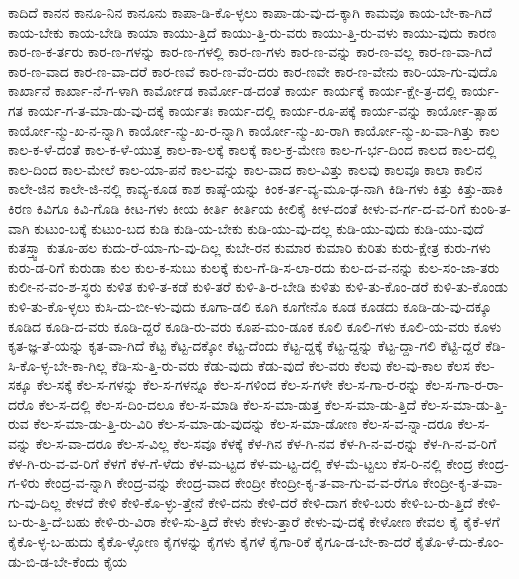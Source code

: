 {ಕಾದಿದೆ
ಕಾನನ
ಕಾನೂ-ನಿನ
ಕಾನೂನು
ಕಾಪಾ-ಡಿ-ಕೊ-ಳ್ಳಲು
ಕಾಪಾ-ಡು-ವು-ದ-ಕ್ಕಾಗಿ
ಕಾಮವೂ
ಕಾಯ-ಬೇ-ಕಾ-ಗಿದೆ
ಕಾಯ-ಬೇಕು
ಕಾಯ-ಬೇಡಿ
ಕಾಯಾ
ಕಾಯು-ತ್ತಿದೆ
ಕಾಯು-ತ್ತಿ-ರು-ವರು
ಕಾಯು-ತ್ತಿ-ರು-ವಳು
ಕಾಯು-ವುದು
ಕಾರಣ
ಕಾರ-ಣ-ಕ-ರ್ತರು
ಕಾರ-ಣ-ಗಳನ್ನು
ಕಾರ-ಣ-ಗಳಲ್ಲಿ
ಕಾರ-ಣ-ಗಳು
ಕಾರ-ಣ-ವನ್ನು
ಕಾರ-ಣ-ವಲ್ಲ
ಕಾರ-ಣ-ವಾ-ಗಿದೆ
ಕಾರ-ಣ-ವಾದ
ಕಾರ-ಣ-ವಾ-ದರೆ
ಕಾರ-ಣವೆ
ಕಾರ-ಣ-ವೆಂ-ದರು
ಕಾರ-ಣವೇ
ಕಾರ-ಣ-ವೇನು
ಕಾರಿ-ಯಾ-ಗು-ವುದೊ
ಕಾರ್ಖಾನೆ
ಕಾರ್ಖಾ-ನೆ-ಗ-ಳಾಗಿ
ಕಾರ್ಮೋಡ
ಕಾರ್ಮೋ-ಡ-ದಂತೆ
ಕಾರ್ಯ
ಕಾರ್ಯಕ್ಕೆ
ಕಾರ್ಯ-ಕ್ಷೇ-ತ್ರ-ದಲ್ಲಿ
ಕಾರ್ಯ-ಗತ
ಕಾರ್ಯ-ಗ-ತ-ಮಾ-ಡು-ವು-ದಕ್ಕೆ
ಕಾರ್ಯತಃ
ಕಾರ್ಯ-ದಲ್ಲಿ
ಕಾರ್ಯ-ರೂ-ಪಕ್ಕೆ
ಕಾರ್ಯ-ವನ್ನು
ಕಾರ್ಯೋ-ತ್ಸಾಹ
ಕಾರ್ಯೋ-ನ್ಮು-ಖ-ನ-ನ್ನಾಗಿ
ಕಾರ್ಯೋ-ನ್ಮು-ಖ-ರ-ನ್ನಾಗಿ
ಕಾರ್ಯೋ-ನ್ಮು-ಖ-ರಾಗಿ
ಕಾರ್ಯೋ-ನ್ಮು-ಖ-ವಾ-ಗಿತ್ತು
ಕಾಲ
ಕಾಲ-ಕ-ಳೆ-ದಂತೆ
ಕಾಲ-ಕ-ಳೆ-ಯುತ್ತ
ಕಾಲ-ಕಾ-ಲಕ್ಕೆ
ಕಾಲಕ್ಕೆ
ಕಾಲ-ಕ್ರ-ಮೇಣ
ಕಾಲ-ಗ-ರ್ಭ-ದಿಂದ
ಕಾಲದ
ಕಾಲ-ದಲ್ಲಿ
ಕಾಲ-ದಿಂದ
ಕಾಲ-ಮೇಲೆ
ಕಾಲ-ಯಾ-ಪನೆ
ಕಾಲ-ವನ್ನು
ಕಾಲ-ವಾದ
ಕಾಲ-ವಿತ್ತು
ಕಾಲವು
ಕಾಲವೂ
ಕಾಲಾ
ಕಾಲಿನ
ಕಾಲೇ-ಜಿನ
ಕಾಲೇ-ಜಿ-ನಲ್ಲಿ
ಕಾವ್ಯ-ಕೂಡ
ಕಾಶ
ಕಾಷ್ಠೆ-ಯನ್ನು
ಕಿಂಕ-ರ್ತ-ವ್ಯ-ಮೂ-ಢ-ನಾಗಿ
ಕಿಡಿ-ಗಳು
ಕಿತ್ತು
ಕಿತ್ತು-ಹಾಕಿ
ಕಿರಣ
ಕಿವಿಗೂ
ಕಿವಿ-ಗೊಡಿ
ಕೀಟ-ಗಳು
ಕೀಯ
ಕೀರ್ತಿ
ಕೀರ್ತಿಯ
ಕೀಲಿಕೈ
ಕೀಳ-ದಂತೆ
ಕೀಳು-ವ-ರ್ಗ-ದ-ವ-ರಿಗೆ
ಕುಂಠಿ-ತ-ವಾಗಿ
ಕುಟುಂ-ಬಕ್ಕೆ
ಕುಟುಂ-ಬದ
ಕುಡಿ
ಕುಡಿ-ಯ-ಬೇಕು
ಕುಡಿ-ಯು-ವು-ದಲ್ಲ
ಕುಡಿ-ಯು-ವುದು
ಕುಡಿ-ಯು-ವುದೆ
ಕುತಸ್ತ್ವಾ
ಕುತೂ-ಹಲ
ಕುದು-ರೆ-ಯಾ-ಗು-ವು-ದಿಲ್ಲ
ಕುಬೇ-ರನ
ಕುಮಾರ
ಕುಮಾರಿ
ಕುರಿತು
ಕುರು-ಕ್ಷೇತ್ರ
ಕುರು-ಗಳು
ಕುರು-ಡ-ರಿಗೆ
ಕುರುಡಾ
ಕುಲ
ಕುಲ-ಕ-ಸುಬು
ಕುಲಕ್ಕೆ
ಕುಲ-ಗೆ-ಡಿ-ಸ-ಲಾ-ರದು
ಕುಲ-ದ-ವ-ನನ್ನು
ಕುಲ-ಸಂ-ಜಾ-ತರು
ಕುಲೀ-ನ-ವಂ-ಶ-ಸ್ಥರು
ಕುಳಿತ
ಕುಳಿ-ತ-ಕಡೆ
ಕುಳಿ-ತರೆ
ಕುಳಿ-ತಿ-ರ-ಬೇಡಿ
ಕುಳಿತು
ಕುಳಿ-ತು-ಕೊಂ-ಡರೆ
ಕುಳಿ-ತು-ಕೊಂಡು
ಕುಳಿ-ತು-ಕೊ-ಳ್ಳಲು
ಕುಸಿ-ದು-ಬೀ-ಳು-ವುದು
ಕೂಗಾ-ಡಲಿ
ಕೂಗಿ
ಕೂಗೇನೊ
ಕೂಡ
ಕೂಡದು
ಕೂಡಿ-ಡು-ವು-ದಕ್ಕೂ
ಕೂಡಿದ
ಕೂಡಿ-ದ-ವರು
ಕೂಡಿ-ದ್ದರೆ
ಕೂಡಿ-ರು-ವರು
ಕೂಪ-ಮಂ-ಡೂಕ
ಕೂಲಿ
ಕೂಲಿ-ಗಳು
ಕೂಲಿ-ಯ-ವರು
ಕೂಳು
ಕೃತ-ಜ್ಞ-ತೆ-ಯನ್ನು
ಕೃತ-ವಾ-ಗಿದೆ
ಕೆಟ್ಟ
ಕೆಟ್ಟ-ದಕ್ಕೋ
ಕೆಟ್ಟ-ದೆಂದು
ಕೆಟ್ಟ-ದ್ದಕ್ಕೆ
ಕೆಟ್ಟ-ದ್ದನ್ನು
ಕೆಟ್ಟ-ದ್ದಾ-ಗಲಿ
ಕೆಟ್ಟಿ-ದ್ದರೆ
ಕೆಡಿ-ಸಿ-ಕೊ-ಳ್ಳ-ಬೇ-ಕಾ-ಗಿಲ್ಲ
ಕೆಡಿ-ಸು-ತ್ತಿ-ರು-ವರು
ಕೆಡು-ವುದು
ಕೆಡು-ವುದೆ
ಕೆಲ-ವರು
ಕೆಲವು
ಕೆಲ-ವು-ಕಾಲ
ಕೆಲಸ
ಕೆಲ-ಸಕ್ಕೂ
ಕೆಲ-ಸಕ್ಕೆ
ಕೆಲ-ಸ-ಗಳನ್ನು
ಕೆಲ-ಸ-ಗಳನ್ನೂ
ಕೆಲ-ಸ-ಗಳಿಂದ
ಕೆಲ-ಸ-ಗಳೇ
ಕೆಲ-ಸ-ಗಾ-ರ-ರನ್ನು
ಕೆಲ-ಸ-ಗಾ-ರ-ರಾ-ದರೊ
ಕೆಲ-ಸ-ದಲ್ಲಿ
ಕೆಲ-ಸ-ದಿಂ-ದಲೂ
ಕೆಲ-ಸ-ಮಾಡಿ
ಕೆಲ-ಸ-ಮಾ-ಡುತ್ತ
ಕೆಲ-ಸ-ಮಾ-ಡು-ತ್ತಿದೆ
ಕೆಲ-ಸ-ಮಾ-ಡು-ತ್ತಿ-ರುವ
ಕೆಲ-ಸ-ಮಾ-ಡು-ತ್ತಿ-ರು-ವಿರಿ
ಕೆಲ-ಸ-ಮಾ-ಡು-ವುದನ್ನು
ಕೆಲ-ಸ-ಮಾ-ಡೋಣ
ಕೆಲ-ಸ-ವ-ನ್ನಾ-ದರೂ
ಕೆಲ-ಸ-ವನ್ನು
ಕೆಲ-ಸ-ವಾ-ದರೂ
ಕೆಲ-ಸ-ವಿಲ್ಲ
ಕೆಲ-ಸವೂ
ಕೆಳಕ್ಕೆ
ಕೆಳ-ಗಿನ
ಕೆಳ-ಗಿ-ನವ
ಕೆಳ-ಗಿ-ನ-ವ-ರನ್ನು
ಕೆಳ-ಗಿ-ನ-ವ-ರಿಗೆ
ಕೆಳ-ಗಿ-ರು-ವ-ವ-ರಿಗೆ
ಕೆಳಗೆ
ಕೆಳ-ಗೆ-ಳೆದು
ಕೆಳ-ಮ-ಟ್ಟದ
ಕೆಳ-ಮ-ಟ್ಟ-ದಲ್ಲಿ
ಕೆಳ-ಮೆ-ಟ್ಟಲು
ಕೆಸ-ರಿ-ನಲ್ಲಿ
ಕೇಂದ್ರ
ಕೇಂದ್ರ-ಗ-ಳಿರು
ಕೇಂದ್ರ-ವ-ನ್ನಾಗಿ
ಕೇಂದ್ರ-ವನ್ನು
ಕೇಂದ್ರ-ವಾದ
ಕೇಂದ್ರೀ
ಕೇಂದ್ರೀ-ಕೃ-ತ-ವಾ-ಗು-ವ-ವ-ರೆಗೂ
ಕೇಂದ್ರೀ-ಕೃ-ತ-ವಾ-ಗು-ವು-ದಿಲ್ಲ
ಕೇಳದೆ
ಕೇಳಿ
ಕೇಳಿ-ಕೊ-ಳ್ಳು-ತ್ತೇನೆ
ಕೇಳಿ-ದನು
ಕೇಳಿ-ದರೆ
ಕೇಳಿ-ದಾಗ
ಕೇಳಿ-ಬರು
ಕೇಳಿ-ಬ-ರು-ತ್ತಿದೆ
ಕೇಳಿ-ಬ-ರು-ತ್ತಿ-ದೆ-ಬಹು
ಕೇಳಿ-ರು-ವಿರಾ
ಕೇಳಿ-ಸು-ತ್ತಿದೆ
ಕೇಳು
ಕೇಳು-ತ್ತಾರೆ
ಕೇಳು-ವು-ದಕ್ಕೆ
ಕೇಳೋಣ
ಕೇವಲ
ಕೈ
ಕೈಕೆ-ಳಗೆ
ಕೈಕೊ-ಳ್ಳ-ಬ-ಹುದು
ಕೈಕೊ-ಳ್ಳೋಣ
ಕೈಗಳನ್ನು
ಕೈಗಳು
ಕೈಗಳೆ
ಕೈಗಾ-ರಿಕೆ
ಕೈಗೂ-ಡ-ಬೇ-ಕಾ-ದರೆ
ಕೈತೊ-ಳೆ-ದು-ಕೊಂ-ಡು-ಬಿ-ಡ-ಬೇ-ಕೆಂದು
ಕೈಯ
}

